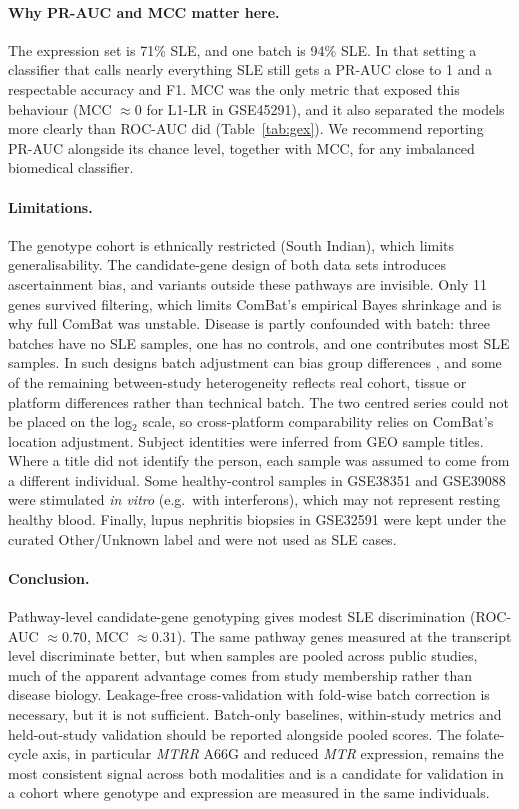 \documentclass[11pt]{article}
\begin{document}
\paragraph{Why PR-AUC and MCC matter here.} The expression set is 71\% SLE, and one batch is 94\% SLE. In that setting a classifier that calls nearly everything SLE still gets a PR-AUC close to 1 and a respectable accuracy and F1. MCC was the only metric that exposed this behaviour (MCC $\approx 0$ for L1-LR in GSE45291), and it also separated the models more clearly than ROC-AUC did (Table~\ref{tab:gex}). We recommend reporting PR-AUC alongside its chance level, together with MCC, for any imbalanced biomedical classifier.

\paragraph{Limitations.} The genotype cohort is ethnically restricted (South Indian), which limits generalisability. The candidate-gene design of both data sets introduces ascertainment bias, and variants outside these pathways are invisible. Only 11 genes survived filtering, which limits ComBat's empirical Bayes shrinkage and is why full ComBat was unstable. Disease is partly confounded with batch: three batches have no SLE samples, one has no controls, and one contributes most SLE samples. In such designs batch adjustment can bias group differences \citep{nygaard2016}, and some of the remaining between-study heterogeneity reflects real cohort, tissue or platform differences rather than technical batch. The two centred series could not be placed on the log$_2$ scale, so cross-platform comparability relies on ComBat's location adjustment. Subject identities were inferred from GEO sample titles. Where a title did not identify the person, each sample was assumed to come from a different individual. Some healthy-control samples in GSE38351 and GSE39088 were stimulated \textit{in vitro} (e.g.\ with interferons), which may not represent resting healthy blood. Finally, lupus nephritis biopsies in GSE32591 were kept under the curated Other/Unknown label and were not used as SLE cases.

\paragraph{Conclusion.} Pathway-level candidate-gene genotyping gives modest SLE discrimination (ROC-AUC $\approx 0.70$, MCC $\approx 0.31$). The same pathway genes measured at the transcript level discriminate better, but when samples are pooled across public studies, much of the apparent advantage comes from study membership rather than disease biology. Leakage-free cross-validation with fold-wise batch correction is necessary, but it is not sufficient. Batch-only baselines, within-study metrics and held-out-study validation should be reported alongside pooled scores. The folate-cycle axis, in particular \textit{MTRR} A66G and reduced \textit{MTR} expression, remains the most consistent signal across both modalities and is a candidate for validation in a cohort where genotype and expression are measured in the same individuals.
\end{document}

